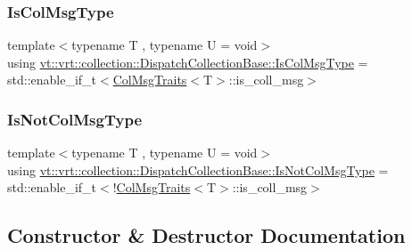 \subsubsection{\texorpdfstring{Is\+Col\+Msg\+Type}{IsColMsgType}}
{\footnotesize\ttfamily template$<$typename T , typename U  = void$>$ \\
using \hyperlink{structvt_1_1vrt_1_1collection_1_1_dispatch_collection_base_a637f8dbdc7970f9991e98e43ff4cf2fe}{vt\+::vrt\+::collection\+::\+Dispatch\+Collection\+Base\+::\+Is\+Col\+Msg\+Type} =  std\+::enable\+\_\+if\+\_\+t$<$\hyperlink{structvt_1_1vrt_1_1collection_1_1_col_msg_traits}{Col\+Msg\+Traits}$<$T$>$\+::is\+\_\+coll\+\_\+msg$>$}

\mbox{\label{structvt_1_1vrt_1_1collection_1_1_dispatch_collection_base_a0e06b294a83d7d0420614237a2db9814}} 
\subsubsection{\texorpdfstring{Is\+Not\+Col\+Msg\+Type}{IsNotColMsgType}}
{\footnotesize\ttfamily template$<$typename T , typename U  = void$>$ \\
using \hyperlink{structvt_1_1vrt_1_1collection_1_1_dispatch_collection_base_a0e06b294a83d7d0420614237a2db9814}{vt\+::vrt\+::collection\+::\+Dispatch\+Collection\+Base\+::\+Is\+Not\+Col\+Msg\+Type} =  std\+::enable\+\_\+if\+\_\+t$<$!\hyperlink{structvt_1_1vrt_1_1collection_1_1_col_msg_traits}{Col\+Msg\+Traits}$<$T$>$\+::is\+\_\+coll\+\_\+msg$>$}



\subsection{Constructor \& Destructor Documentation}
\mbox{\label{structvt_1_1vrt_1_1collection_1_1_dispatch_collection_base_a96f6594a04faa4519a553b18bf2b2e6d}} 
